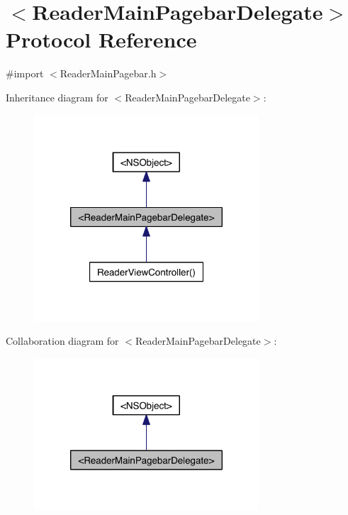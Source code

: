 \hypertarget{protocol_reader_main_pagebar_delegate-p}{\section{$<$Reader\-Main\-Pagebar\-Delegate$>$ Protocol Reference}
\label{d9/d22/protocol_reader_main_pagebar_delegate-p}
}


{\ttfamily \#import $<$Reader\-Main\-Pagebar.\-h$>$}



Inheritance diagram for $<$Reader\-Main\-Pagebar\-Delegate$>$\-:
\nopagebreak
\begin{figure}[H]
\begin{center}
\leavevmode
\includegraphics[width=238pt]{dd/dc6/protocol_reader_main_pagebar_delegate-p__inherit__graph}
\end{center}
\end{figure}


Collaboration diagram for $<$Reader\-Main\-Pagebar\-Delegate$>$\-:
\nopagebreak
\begin{figure}[H]
\begin{center}
\leavevmode
\includegraphics[width=238pt]{d5/d71/protocol_reader_main_pagebar_delegate-p__coll__graph}
\end{center}
\end{figure}
